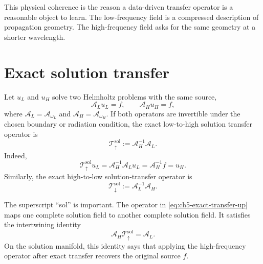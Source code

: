 This physical coherence is the reason a data-driven transfer operator is a
reasonable object to learn. The low-frequency field is a compressed
description of propagation geometry. The high-frequency field asks for the
same geometry at a shorter wavelength.

\section{Exact solution transfer}
\label{sec:ch5-solution-transfer}

Let $u_L$ and $u_H$ solve two Helmholtz problems with the same source,
\begin{equation}
    \mathcal{A}_L u_L=f,
    \qquad
    \mathcal{A}_H u_H=f,
    \label{eq:ch5-two-frequency-solves}
\end{equation}
where $\mathcal{A}_L=\mathcal{A}_{\omega_L}$ and
$\mathcal{A}_H=\mathcal{A}_{\omega_H}$. If both operators are invertible under
the chosen boundary or radiation condition, the exact low-to-high solution
transfer operator is
\begin{equation}
    \mathcal{T}_{\uparrow}^{\mathrm{sol}}
    :=
    \mathcal{A}_H^{-1}\mathcal{A}_L.
    \label{eq:ch5-exact-transfer-up}
\end{equation}
Indeed,
\begin{equation}
    \mathcal{T}_{\uparrow}^{\mathrm{sol}}u_L
    =
    \mathcal{A}_H^{-1}\mathcal{A}_L u_L
    =
    \mathcal{A}_H^{-1}f
    =
    u_H.
    \label{eq:ch5-transfer-maps-solution}
\end{equation}
Similarly, the exact high-to-low solution-transfer operator is
\begin{equation}
    \mathcal{T}_{\downarrow}^{\mathrm{sol}}
    :=
    \mathcal{A}_L^{-1}\mathcal{A}_H.
    \label{eq:ch5-exact-transfer-down}
\end{equation}

The superscript ``sol'' is important. The operator in
\eqref{eq:ch5-exact-transfer-up} maps one complete solution field to another
complete solution field. It satisfies the intertwining identity
\begin{equation}
    \mathcal{A}_H\mathcal{T}_{\uparrow}^{\mathrm{sol}}
    =
    \mathcal{A}_L.
    \label{eq:ch5-solution-intertwining}
\end{equation}
On the solution manifold, this identity says that applying the high-frequency
operator after exact transfer recovers the original source $f$.

